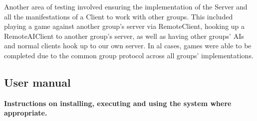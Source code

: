 \documentclass[a4paper,doc,draftfirst]{apa6}
\begin{document}
\begin{appendices}
Another area of testing involved ensuring the implementation of the Server and all the manifestations of a Client to work with other groups. This included playing a game against another group's server via RemoteClient, hooking up a RemoteAIClient to another group's server, as well as having other groups' AIs and normal clients hook up to our own server. In al cases, games were able to be completed due to the common group protocol across all groups' implementations. 

\subsection{User manual}
\textbf{Instructions on installing, executing and using the system where appropriate.}



\end{appendices}



\printbibliography
\end{document}
